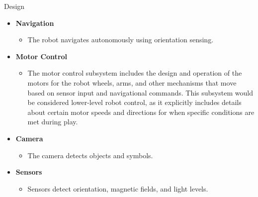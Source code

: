 \documentclass[final]{beamer}
\newlength{\colwidth}
\begin{document}
\begin{frame}[t]
\begin{columns}[t]
\begin{column}{\colwidth}
  \begin{block}{Design}
    \begin{itemize}
    
      \item \textbf{Navigation}
        \begin{itemize}
          \item The robot navigates autonomously using orientation sensing.
        \end{itemize}
        
      \item \textbf{Motor Control}
        \begin{itemize}
          \item The motor control subsystem includes the design and operation of the motors for the robot wheels, arms, and other mechanisms that move based on sensor input and navigational commands. This subsystem would be considered lower-level robot control, as it explicitly includes details about certain motor speeds and directions for when specific conditions are met during play.
        \end{itemize}
      
      \item \textbf{Camera}
        \begin{itemize}
          \item The camera detects objects and symbols.
        \end{itemize}
      
      \item \textbf{Sensors}
        \begin{itemize}
          \item Sensors detect orientation, magnetic fields, and light levels.
        \end{itemize}
    
    \end{itemize}
  
  \end{block}



    


\end{column}
\end{columns}
\end{frame}
\end{document}
